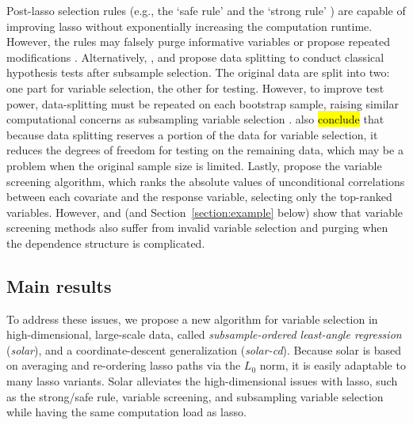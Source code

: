 \documentclass[12pt]{article}
\begin{document}
Post-lasso selection rules (e.g., the `safe rule' \citep{ghaoui2010safe} and the `strong rule' \citep{tibshirani2012strong}) are capable of improving lasso without exponentially increasing the computation runtime. However, the rules may falsely purge informative variables or propose repeated modifications \citep{wang2014safe, zeng2017efficient}. Alternatively, \citet{wasserman2009high}, \citet{meinshausen2009p} and \citet{barber2019knockoff} propose data splitting to conduct classical hypothesis tests after subsample selection. The original data are split into two: one part for variable selection, the other for testing. However, to improve test power, data-splitting must be repeated on each bootstrap sample, raising similar computational concerns as subsampling variable selection \citep{bach2008bolasso,meinshausen2010stability}. \citet{diciccio2020exact} also \hl{conclude} that because data splitting reserves a portion of the data for variable selection, it reduces the degrees of freedom for testing on the remaining data, which may be a problem when the original sample size is limited. Lastly, \citet{fan2008sure} propose the variable screening algorithm, which ranks the absolute values of unconditional correlations between each covariate and the response variable, selecting only the top-ranked variables. However, \citet{fan2008sure} and \citet{barut2016conditional} (and Section~\ref{section:example} below) show that variable screening methods also suffer from invalid variable selection and purging when the dependence structure is complicated.

\subsection{Main results}

To address these issues, we propose a new algorithm for variable selection in high-dimensional, large-scale data, called \emph{subsample-ordered least-angle regression} (\emph{solar}), and a coordinate-descent generalization (\emph{solar-cd}). Because solar is based on averaging and re-ordering lasso paths via the $L_0$ norm, it is easily adaptable to many lasso variants. Solar alleviates the high-dimensional issues with lasso, such as the strong/safe rule, variable screening, and subsampling variable selection while having the same computation load as lasso.
\end{document}
